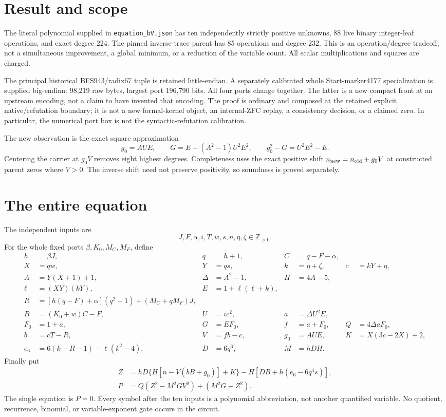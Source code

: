 \section{Result and scope}
The literal polynomial supplied in \texttt{equation\_bV.json} has ten
independently strictly positive unknowns, 88 live binary integer-leaf
operations, and exact degree 224. The pinned inverse-trace parent has
85 operations and degree 232. This is an operation/degree tradeoff, not a
simultaneous improvement, a global minimum, or a reduction of the variable
count. All scalar multiplications and squares are charged.

The principal historical BFS943/radix67 tuple is retained little-endian.
A separately calibrated whole Start-marker4177 specialization is supplied
big-endian: 98,219 raw bytes, largest port 196,790 bits. All four ports
change together. The latter is a new compact front at an upstream encoding,
not a claim to have invented that encoding. The proof is ordinary and
composed at the retained explicit native/refutation boundary; it is not a
new formal-kernel object, an internal-ZFC replay, a consistency decision,
or a claimed zero. In particular, the numerical port box is not the
syntactic-refutation calibration.

The new observation is the exact square approximation
\[
 g_0=AUE,\qquad G=E+(A^2-1)U^2E^2,
 \qquad g_0^2-G=U^2E^2-E.
\]
Centering the carrier at $g_0V$ removes eight highest degrees. Completeness uses the exact positive shift $n_{\rm new}=n_{\rm old}+g_0V$
at constructed parent zeros where $V>0$. The inverse shift need not
preserve positivity, so soundness is proved separately.

\section{The entire equation}
The independent inputs are
\[
 J,F,\alpha,i,T,w,s,n,\eta,\zeta\in\mathbb Z_{>0}.
\]
For the whole fixed ports $\beta,K_0,M_C,M_F$, define
\begin{align*}
 h&=\beta J,&q&=h+1,&C&=q-F-\alpha,\\
 X&=qw,&Y&=qs,&k&=\eta+\zeta,&c&=kY+\eta,\\
 A&=Y(X+1)+1,&\Delta&=A^2-1,&H&=4A-5,\\
 \ell&=(XY)(kY),&E&=1+\ell(\ell+k),\\
 R&=[h(q-F)+\alpha](q^2-1)+(M_C+qM_F)J,\\
 B&=(K_0+w)C-F,&U&=ic^2,&a&=\Delta U^2E,\\
 F_0&=1+a,&G&=EF_0,&f&=a+F_0,&Q&=4\Delta aF_0,\\
 b&=cT-R,&V&=fb-c,&g_0&=AUE,&K&=X(3c-2X)+2,\\
 e_6&=6(k-R-1)-\ell(k^2-4),&D&=6q^6,&M&=hDH.
\end{align*}
Finally put
\begin{align}
 Z&=hD\{H[n-V(bB+g_0)]+K\}-H[DB+h(e_6-6q^4s)],\label{eq:Z}\\
 P&=Q(Z^2-M^2GV^2)+(M^2G-Z^2).\label{eq:P}
\end{align}
The single equation is $P=0$. Every symbol after the ten inputs is a
polynomial abbreviation, not another quantified variable. No quotient,
recurrence, binomial, or variable-exponent gate occurs in the circuit.

